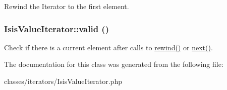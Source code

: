 \label{classIsisValueIterator_a175fe47671b335eecc591598053a6a88}
Rewind the Iterator to the first element. \hypertarget{classIsisValueIterator_a7f6b3e0941c2110f1b2ba10ba2b87fb8}{
\subsubsection[{valid}]{\setlength{\rightskip}{0pt plus 5cm}IsisValueIterator::valid ()}}
\label{classIsisValueIterator_a7f6b3e0941c2110f1b2ba10ba2b87fb8}
Check if there is a current element after calls to \hyperlink{classIsisValueIterator_a175fe47671b335eecc591598053a6a88}{rewind()} or \hyperlink{classIsisValueIterator_adc2fb9b1dd029cab4be0b48d6e0f11f9}{next()}. 

The documentation for this class was generated from the following file:\begin{DoxyCompactItemize}
\item 
classes/iterators/IsisValueIterator.php\end{DoxyCompactItemize}
